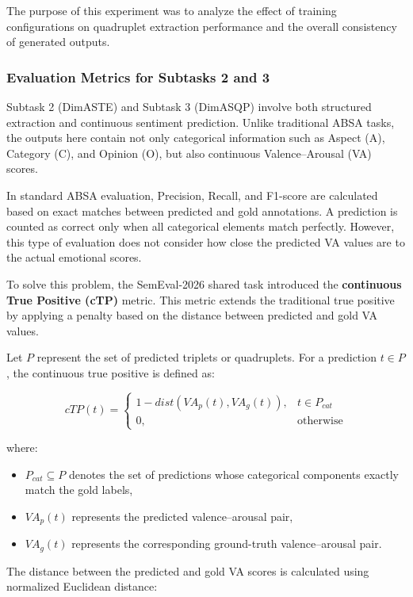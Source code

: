 \documentclass{article}
\begin{document}
The purpose of this experiment was to analyze the effect of training configurations on quadruplet extraction performance and the overall consistency of generated outputs.

\subsubsection{Evaluation Metrics for Subtasks 2 and 3}

Subtask 2 (DimASTE) and Subtask 3 (DimASQP) involve both structured extraction and continuous sentiment prediction. Unlike traditional ABSA tasks, the outputs here contain not only categorical information such as Aspect (A), Category (C), and Opinion (O), but also continuous Valence–Arousal (VA) scores.

In standard ABSA evaluation, Precision, Recall, and F1-score are calculated based on exact matches between predicted and gold annotations. A prediction is counted as correct only when all categorical elements match perfectly. However, this type of evaluation does not consider how close the predicted VA values are to the actual emotional scores.

To solve this problem, the SemEval-2026 shared task introduced the \textbf{continuous True Positive (cTP)} metric. This metric extends the traditional true positive by applying a penalty based on the distance between predicted and gold VA values.

Let $P$ represent the set of predicted triplets or quadruplets. For a prediction $t \in P$, the continuous true positive is defined as:

\begin{equation}
cTP(t)=
\begin{cases}
1 - dist(VA_p(t), VA_g(t)), & t \in P_{cat} \\
0, & \text{otherwise}
\end{cases}
\end{equation}

where:
\begin{itemize}
    \item $P_{cat} \subseteq P$ denotes the set of predictions whose categorical components exactly match the gold labels,
    \item $VA_p(t)$ represents the predicted valence–arousal pair,
    \item $VA_g(t)$ represents the corresponding ground-truth valence–arousal pair.
\end{itemize}

The distance between the predicted and gold VA scores is calculated using normalized Euclidean distance:
\end{document}
